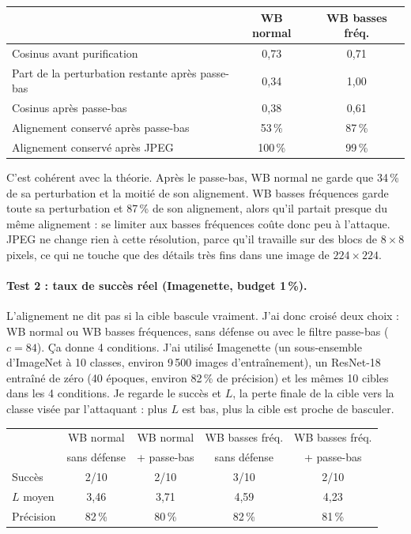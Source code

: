 \begin{center}
\small
\begin{tabular}{@{}lcc@{}}
\toprule
& WB normal & WB basses fréq. \\
\midrule
Cosinus avant purification & 0{,}73 & 0{,}71 \\
Part de la perturbation restante après passe-bas & 0{,}34 & 1{,}00 \\
Cosinus après passe-bas & 0{,}38 & 0{,}61 \\
Alignement conservé après passe-bas & 53\,\% & 87\,\% \\
Alignement conservé après JPEG & 100\,\% & 99\,\% \\
\bottomrule
\end{tabular}
\end{center}

C'est cohérent avec la théorie. Après le passe-bas, WB normal ne garde
que 34\,\% de sa perturbation et la moitié de son alignement. WB basses
fréquences garde toute sa perturbation et 87\,\% de son alignement, alors
qu'il partait presque du même alignement : se limiter aux basses
fréquences coûte donc peu à l'attaque. JPEG ne change rien à cette
résolution, parce qu'il travaille sur des blocs de $8\times8$ pixels, ce
qui ne touche que des détails très fins dans une image de
$224\times224$.

\paragraph{Test 2 : taux de succès réel (Imagenette, budget 1\,\%).}
L'alignement ne dit pas si la cible bascule vraiment. J'ai donc croisé
deux choix : WB normal ou WB basses fréquences, sans défense ou avec le
filtre passe-bas ($c=84$). Ça donne 4 conditions. J'ai utilisé Imagenette
(un sous-ensemble d'ImageNet à 10 classes, environ 9\,500 images
d'entraînement), un ResNet-18 entraîné de zéro (40 époques, environ
82\,\% de précision) et les mêmes 10 cibles dans les 4 conditions. Je
regarde le succès et $L$, la perte finale de la cible vers la classe
visée par l'attaquant : plus $L$ est bas, plus la cible est proche de
basculer.

\begin{center}
\small
\begin{tabular}{@{}lcccc@{}}
\toprule
& WB normal & WB normal & WB basses fréq. & WB basses fréq. \\
& sans défense & + passe-bas & sans défense & + passe-bas \\
\midrule
Succès & 2/10 & 2/10 & 3/10 & 2/10 \\
$L$ moyen & 3{,}46 & 3{,}71 & 4{,}59 & 4{,}23 \\
Précision & 82\,\% & 80\,\% & 82\,\% & 81\,\% \\
\bottomrule
\end{tabular}
\end{center}

